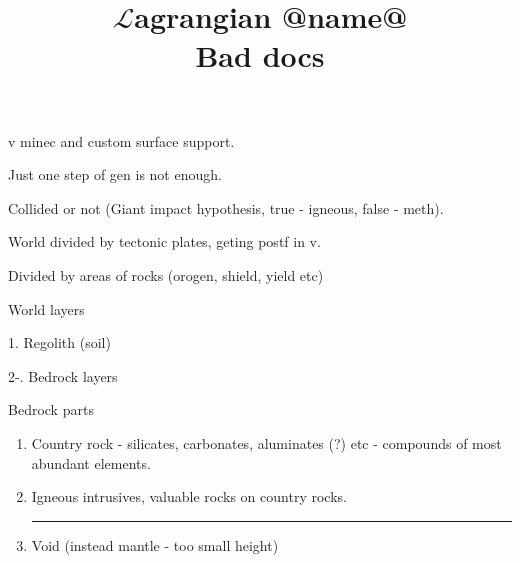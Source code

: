 \documentclass[12pt]{article}
\title{$\mathcal{L}$agrangian @name@ \\ Bad docs}
\begin{document}
    \maketitle

    v minec and custom surface support.

    Just one step of gen is not enough.

    Collided or not (Giant impact hypothesis, true - igneous, false - meth).

    World divided by tectonic plates, geting postf in v.

    Divided by areas of rocks (orogen, shield, yield etc)

    World layers

    1. Regolith (soil)

    2-\infty. Bedrock layers

    Bedrock parts

    \begin{enumerate}
    \item Country rock - silicates, carbonates, aluminates (?) etc - compounds of most abundant elements.
    \item Igneous intrusives, valuable rocks on country rocks. \\
    \noindent\rule{\textwidth}{0.4pt}
    \item Void (instead mantle - too small height)
    \end{enumerate}
\end{document}
